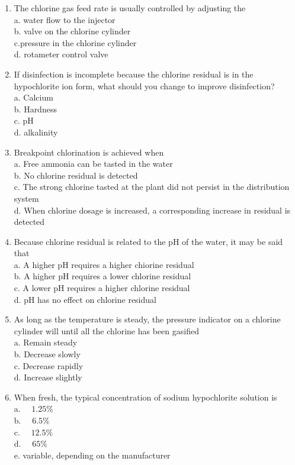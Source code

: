 \documentclass{article}
\begin{document}
\begin{enumerate}
\item The chlorine gas feed rate is usually controlled by adjusting the\\
a. water flow to the injector\\
b. valve on the chlorine cylinder\\
c.pressure in the chlorine cylinder\\
d. rotameter control valve\\
\item If disinfection is incomplete because the chlorine residual is in the hypochlorite ion form, what should you change to improve disinfection?\\
a. Calcium\\
b. Hardness\\
c. pH\\
d. alkalinity\\
\item Breakpoint chlorination is achieved when\\
a. Free ammonia can be tasted in the water\\
b. No chlorine residual is detected\\
c. The strong chlorine tasted at the plant did not persist in the distribution system\\
d. When chlorine dosage is increased, a corresponding increase in residual is detected\\

\item Because chlorine residual is related to the $\mathrm{pH}$ of the water, it may be said that\\
a. A higher $\mathrm{pH}$ requires a higher chiorine residual\\
b. A higher $\mathrm{pH}$ requires a lower chlorine residual\\
c. A lower pH requires a higher chlorine residual\\
d. pH  has no effect on chlorine residual\\


  \item As long as the temperature is steady, the pressure indicator on a chlorine cylinder will until all the chlorine has been gasified\\
a. Remain steady\\
b. Decrease slowly\\
c. Decrease rapidly\\
d. Increase slightly\\

\item When fresh, the typical concentration of sodium hypochlorite solution is\\
a. $\quad 1.25 \%$\\
b. $\quad 6.5 \%$\\
c. $\quad 12.5 \%$\\
d. $\quad 65 \%$\\
e. variable, depending on the manufacturer\\


\end{enumerate}
\end{document}
